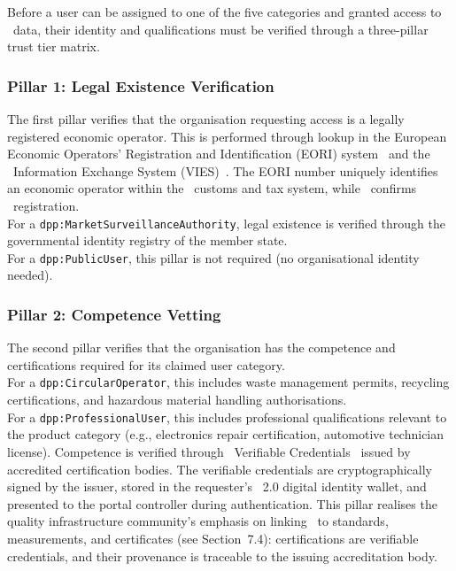 Before a user can be assigned to one of the five categories and granted access
to \DPP\ data, their identity and qualifications must be verified through a
three-pillar trust tier matrix.

\subsubsection{Pillar 1: Legal Existence Verification}

The first pillar verifies that the organisation requesting access is a legally
registered economic operator. This is performed through lookup in the European
Economic Operators' Registration and Identification (EORI)
system~\cite{eori_system} and the \VAT\ Information Exchange System
(VIES)~\cite{vies_system}. The EORI number uniquely identifies an economic
operator within the \EU\ customs and tax system, while \VIES\ confirms \VAT\
registration.
\\
For a \texttt{dpp:MarketSurveillanceAuthority}, legal existence is verified
through the governmental identity registry of the member state.
\\
For a \texttt{dpp:PublicUser}, this pillar is not required (no organisational
identity needed).

\subsubsection{Pillar 2: Competence Vetting}

The second pillar verifies that the organisation has the competence and
certifications required for its claimed user category.
\\
For a \texttt{dpp:CircularOperator}, this includes waste management permits,
recycling certifications, and hazardous material handling authorisations.
\\
For a \texttt{dpp:ProfessionalUser}, this includes professional qualifications
relevant to the product category (e.g., electronics repair certification,
automotive technician license). Competence is verified through \WthreeC\
Verifiable Credentials~\cite{verifiable_credentials} issued by accredited
certification bodies. The verifiable credentials are cryptographically signed by
the issuer, stored in the requester's \eIDAS~2.0 digital identity wallet, and
presented to the portal controller during authentication. This pillar realises
the quality infrastructure community's emphasis on linking \DPPs\ to standards,
measurements, and certificates (see Section~7.4): certifications are verifiable
credentials, and their provenance is traceable to the issuing accreditation
body.

